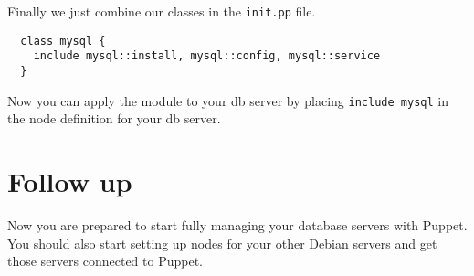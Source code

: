 \documentclass{article}   	%
\begin{document}
Finally we just combine our classes in the \texttt{init.pp} file.

\begin{verbatim}
  class mysql {
    include mysql::install, mysql::config, mysql::service
  }
\end{verbatim}

Now you can apply the module to your db server by placing \texttt{include mysql} in the node definition for your db server.

\section{Follow up}
Now you are prepared to start fully managing your database servers with Puppet.  You should also start setting up nodes for your other Debian servers and get those servers connected to Puppet.
\end{document}

